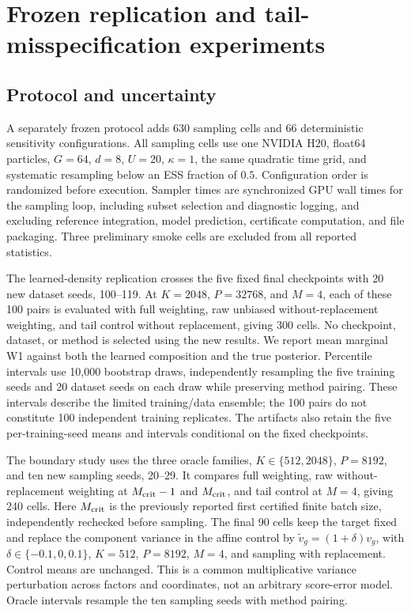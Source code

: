 \clearpage
\raggedbottom
\section{Frozen replication and tail-misspecification experiments}\label{app:solid}

\subsection{Protocol and uncertainty}
A separately frozen protocol adds 630 sampling cells and 66 deterministic sensitivity configurations. All sampling cells use one NVIDIA H20, float64 particles, $G=64$, $d=8$, $U=20$, $\kappa=1$, the same quadratic time grid, and systematic resampling below an ESS fraction of $0.5$. Configuration order is randomized before execution. Sampler times are synchronized GPU wall times for the sampling loop, including subset selection and diagnostic logging, and excluding reference integration, model prediction, certificate computation, and file packaging. Three preliminary smoke cells are excluded from all reported statistics.

The learned-density replication crosses the five fixed final checkpoints with 20 new dataset seeds, 100--119. At $K=2048$, $P=32768$, and $M=4$, each of these 100 pairs is evaluated with full weighting, raw unbiased without-replacement weighting, and tail control without replacement, giving 300 cells. No checkpoint, dataset, or method is selected using the new results. We report mean marginal W1 against both the learned composition and the true posterior. Percentile intervals use 10,000 bootstrap draws, independently resampling the five training seeds and 20 dataset seeds on each draw while preserving method pairing. These intervals describe the limited training/data ensemble; the 100 pairs do not constitute 100 independent training replicates. The artifacts also retain the five per-training-seed means and intervals conditional on the fixed checkpoints.

The boundary study uses the three oracle families, $K\in\{512,2048\}$, $P=8192$, and ten new sampling seeds, 20--29. It compares full weighting, raw without-replacement weighting at $M_{\rm crit}-1$ and $M_{\rm crit}$, and tail control at $M=4$, giving 240 cells. Here $M_{\rm crit}$ is the previously reported first certified finite batch size, independently rechecked before sampling. The final 90 cells keep the target fixed and replace the component variance in the affine control by $\widetilde v_g=(1+\delta)v_g$, with $\delta\in\{-0.1,0,0.1\}$, $K=512$, $P=8192$, $M=4$, and sampling with replacement. Control means are unchanged. This is a common multiplicative variance perturbation across factors and coordinates, not an arbitrary score-error model. Oracle intervals resample the ten sampling seeds with method pairing.

